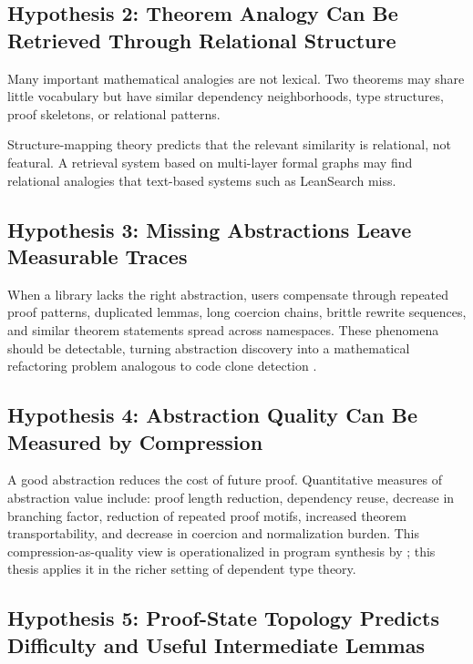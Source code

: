 \documentclass[12pt, a4paper]{article}
\begin{document}
\subsection{Hypothesis 2: Theorem Analogy Can Be Retrieved Through Relational
Structure}

Many important mathematical analogies are not lexical. Two theorems may
share little vocabulary but have similar dependency neighborhoods, type
structures, proof skeletons, or relational patterns.

Structure-mapping theory \citep{gentner1983, falkenhainer1989sme} predicts
that the relevant similarity is relational, not featural. A retrieval system
based on multi-layer formal graphs may find relational analogies that
text-based systems such as LeanSearch \citep{gao2024leansearch} miss.

\subsection{Hypothesis 3: Missing Abstractions Leave Measurable Traces}

When a library lacks the right abstraction, users compensate through repeated
proof patterns, duplicated lemmas, long coercion chains, brittle rewrite
sequences, and similar theorem statements spread across namespaces. These
phenomena should be detectable, turning abstraction discovery into a
mathematical refactoring problem analogous to code clone detection
\citep{roycordy2007, koschke2007}.

\subsection{Hypothesis 4: Abstraction Quality Can Be Measured by Compression}

A good abstraction reduces the cost of future proof. Quantitative measures
of abstraction value include: proof length reduction, dependency reuse,
decrease in branching factor, reduction of repeated proof motifs, increased
theorem transportability, and decrease in coercion and normalization burden.
This compression-as-quality view is operationalized in program synthesis by
\citet{bowers2023stitch}; this thesis applies it in the richer setting of
dependent type theory.

\subsection{Hypothesis 5: Proof-State Topology Predicts Difficulty and
Useful Intermediate Lemmas}
\end{document}
